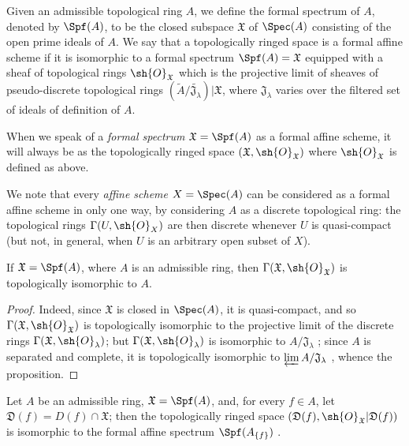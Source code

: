 \begin{definition}[10.1.2]
\label{I.10.1.2}
Given an admissible topological ring $A$, we define the formal spectrum of $A$, denoted by $\Spf(A)$, to be the closed subspace $\mathfrak{X}$ of $\Spec(A)$ consisting of the open prime ideals of $A$.
We say that a topologically ringed space is a formal affine scheme if it is isomorphic to a formal spectrum $\Spf(A)=\mathfrak{X}$ equipped with a sheaf of topological rings $\sh{O}_\mathfrak{X}$ which is the projective limit of sheaves of pseudo-discrete topological rings $(\widetilde{A}/\widetilde{\mathfrak{J}_\lambda})|\mathfrak{X}$, where $\mathfrak{J}_\lambda$ varies over the filtered set of ideals of definition of $A$.
\end{definition}

When we speak of a \emph{formal spectrum $\mathfrak{X}=\Spf(A)$} as a formal affine scheme, it will always be as the topologically ringed space $(\mathfrak{X},\sh{O}_\mathfrak{X})$ where $\sh{O}_\mathfrak{X}$ is defined as above.

We note that every \emph{affine scheme} $X=\Spec(A)$ can be considered as a formal affine scheme in only one way, by considering $A$ as a discrete topological ring: the topological rings $\Gamma(U,\sh{O}_X)$ are then discrete whenever $U$ is quasi-compact (but not, in general, when $U$ is an arbitrary open subset of $X$).

\begin{proposition}[10.1.3]
\label{I.10.1.3}
If $\mathfrak{X}=\Spf(A)$, where $A$ is an admissible ring, then $\Gamma(\mathfrak{X},\sh{O}_\mathfrak{X})$ is topologically isomorphic to $A$.
\end{proposition}

\begin{proof}
Indeed, since $\mathfrak{X}$ is closed in $\Spec(A)$, it is quasi-compact, and so $\Gamma(\mathfrak{X},\sh{O}_\mathfrak{X})$ is topologically isomorphic to the projective limit of the discrete rings $\Gamma(\mathfrak{X},\sh{O}_\lambda)$; but $\Gamma(\mathfrak{X},\sh{O}_\lambda)$ is isomorphic to $A/\mathfrak{J}_\lambda$ ; since $A$ is separated and complete, it is topologically isomorphic to $\varprojlim A/\mathfrak{J}_\lambda$ , whence the proposition.
\end{proof}

\begin{proposition}[10.1.4]
\label{I.10.1.4}
Let $A$ be an admissible ring, $\mathfrak{X}=\Spf(A)$, and, for every $f\in A$, let $\mathfrak{D}(f)=D(f)\cap\mathfrak{X}$; then the topologically ringed space $(\mathfrak{D}(f),\sh{O}_\mathfrak{X}|\mathfrak{D}(f))$ is isomorphic to the formal affine spectrum $\Spf(A_{\{f\}})$ .
\end{proposition}

